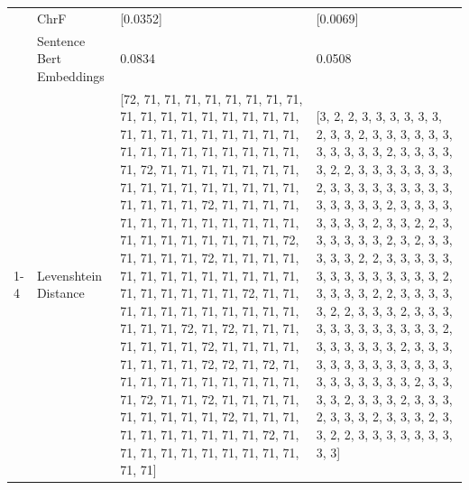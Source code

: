 \begin{tabular}{llll}
 & ChrF & [0.0352] & [0.0069] \\
 & Sentence Bert Embeddings & 0.0834 & 0.0508 \\
\cline{1-4}
\multirow[t]{4}{*}{Abakazi abangi bafuula musajja waabwe okwogera} & Levenshtein Distance & [72, 71, 71, 71, 71, 71, 71, 71, 71, 71, 71, 71, 71, 71, 71, 71, 71, 71, 71, 71, 71, 71, 71, 71, 71, 71, 71, 71, 71, 71, 71, 71, 71, 71, 71, 71, 71, 72, 71, 71, 71, 71, 71, 71, 71, 71, 71, 71, 71, 71, 71, 71, 71, 71, 71, 71, 71, 71, 72, 71, 71, 71, 71, 71, 71, 71, 71, 71, 71, 71, 71, 71, 71, 71, 71, 71, 71, 71, 71, 71, 72, 71, 71, 71, 71, 72, 71, 71, 71, 71, 71, 71, 71, 71, 71, 71, 71, 71, 71, 71, 71, 71, 71, 71, 71, 72, 71, 71, 71, 71, 71, 71, 71, 71, 71, 71, 71, 71, 71, 71, 72, 71, 72, 71, 71, 71, 71, 71, 71, 71, 72, 71, 71, 71, 71, 71, 71, 71, 71, 72, 72, 71, 72, 71, 71, 71, 71, 71, 71, 71, 71, 71, 71, 71, 72, 71, 71, 72, 71, 71, 71, 71, 71, 71, 71, 71, 71, 72, 71, 71, 71, 71, 71, 71, 71, 71, 71, 71, 72, 71, 71, 71, 71, 71, 71, 71, 71, 71, 71, 71, 71] & [3, 2, 2, 3, 3, 3, 3, 3, 3, 2, 3, 3, 2, 3, 3, 3, 3, 3, 3, 3, 3, 3, 3, 3, 2, 3, 3, 3, 3, 3, 2, 2, 3, 3, 3, 3, 3, 3, 3, 2, 3, 3, 3, 3, 3, 3, 3, 3, 3, 3, 3, 3, 3, 3, 2, 3, 3, 3, 3, 3, 3, 3, 3, 2, 3, 3, 2, 2, 3, 3, 3, 3, 3, 3, 2, 3, 2, 3, 3, 3, 3, 3, 2, 2, 3, 3, 3, 3, 3, 3, 3, 3, 3, 3, 3, 3, 3, 3, 2, 3, 3, 3, 3, 2, 2, 3, 3, 3, 3, 3, 2, 2, 3, 3, 3, 2, 3, 3, 3, 3, 3, 3, 3, 3, 3, 3, 3, 3, 2, 3, 3, 3, 3, 3, 3, 2, 3, 3, 3, 3, 3, 3, 3, 3, 3, 3, 3, 3, 3, 3, 3, 3, 3, 3, 3, 3, 2, 3, 3, 3, 3, 2, 3, 3, 3, 2, 3, 3, 3, 2, 3, 3, 3, 2, 3, 3, 3, 2, 3, 3, 2, 2, 3, 3, 3, 3, 3, 3, 3, 3, 3] \\

\end{tabular}
